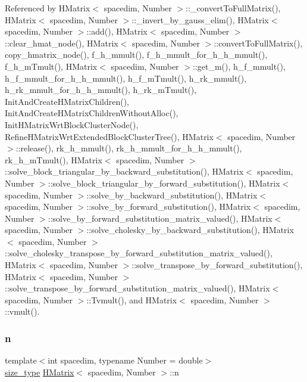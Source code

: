 Referenced by H\+Matrix$<$ spacedim, Number $>$\+::\+\_\+convert\+To\+Full\+Matrix(), H\+Matrix$<$ spacedim, Number $>$\+::\+\_\+invert\+\_\+by\+\_\+gauss\+\_\+elim(), H\+Matrix$<$ spacedim, Number $>$\+::add(), H\+Matrix$<$ spacedim, Number $>$\+::clear\+\_\+hmat\+\_\+node(), H\+Matrix$<$ spacedim, Number $>$\+::convert\+To\+Full\+Matrix(), copy\+\_\+hmatrix\+\_\+node(), f\+\_\+h\+\_\+mmult(), f\+\_\+h\+\_\+mmult\+\_\+for\+\_\+h\+\_\+h\+\_\+mmult(), f\+\_\+h\+\_\+m\+Tmult(), H\+Matrix$<$ spacedim, Number $>$\+::get\+\_\+m(), h\+\_\+f\+\_\+mmult(), h\+\_\+f\+\_\+mmult\+\_\+for\+\_\+h\+\_\+h\+\_\+mmult(), h\+\_\+f\+\_\+m\+Tmult(), h\+\_\+rk\+\_\+mmult(), h\+\_\+rk\+\_\+mmult\+\_\+for\+\_\+h\+\_\+h\+\_\+mmult(), h\+\_\+rk\+\_\+m\+Tmult(), Init\+And\+Create\+H\+Matrix\+Children(), Init\+And\+Create\+H\+Matrix\+Children\+Without\+Alloc(), Init\+H\+Matrix\+Wrt\+Block\+Cluster\+Node(), Refine\+H\+Matrix\+Wrt\+Extended\+Block\+Cluster\+Tree(), H\+Matrix$<$ spacedim, Number $>$\+::release(), rk\+\_\+h\+\_\+mmult(), rk\+\_\+h\+\_\+mmult\+\_\+for\+\_\+h\+\_\+h\+\_\+mmult(), rk\+\_\+h\+\_\+m\+Tmult(), H\+Matrix$<$ spacedim, Number $>$\+::solve\+\_\+block\+\_\+triangular\+\_\+by\+\_\+backward\+\_\+substitution(), H\+Matrix$<$ spacedim, Number $>$\+::solve\+\_\+block\+\_\+triangular\+\_\+by\+\_\+forward\+\_\+substitution(), H\+Matrix$<$ spacedim, Number $>$\+::solve\+\_\+by\+\_\+backward\+\_\+substitution(), H\+Matrix$<$ spacedim, Number $>$\+::solve\+\_\+by\+\_\+forward\+\_\+substitution(), H\+Matrix$<$ spacedim, Number $>$\+::solve\+\_\+by\+\_\+forward\+\_\+substitution\+\_\+matrix\+\_\+valued(), H\+Matrix$<$ spacedim, Number $>$\+::solve\+\_\+cholesky\+\_\+by\+\_\+backward\+\_\+substitution(), H\+Matrix$<$ spacedim, Number $>$\+::solve\+\_\+cholesky\+\_\+transpose\+\_\+by\+\_\+forward\+\_\+substitution\+\_\+matrix\+\_\+valued(), H\+Matrix$<$ spacedim, Number $>$\+::solve\+\_\+transpose\+\_\+by\+\_\+forward\+\_\+substitution(), H\+Matrix$<$ spacedim, Number $>$\+::solve\+\_\+transpose\+\_\+by\+\_\+forward\+\_\+substitution\+\_\+matrix\+\_\+valued(), H\+Matrix$<$ spacedim, Number $>$\+::\+Tvmult(), and H\+Matrix$<$ spacedim, Number $>$\+::vmult().

\mbox{\label{classHMatrix_ab5ae2eb472f81f80653ed4411629c2d1}} 
\subsubsection{\texorpdfstring{n}{n}}
{\footnotesize\ttfamily template$<$int spacedim, typename Number = double$>$ \\
\hyperlink{classHMatrix_a5ca8dc549783d38371a01ecd621ecb34}{size\+\_\+type} \hyperlink{classHMatrix}{H\+Matrix}$<$ spacedim, Number $>$\+::n\hspace{0.3cm}{\ttfamily [private]}}

